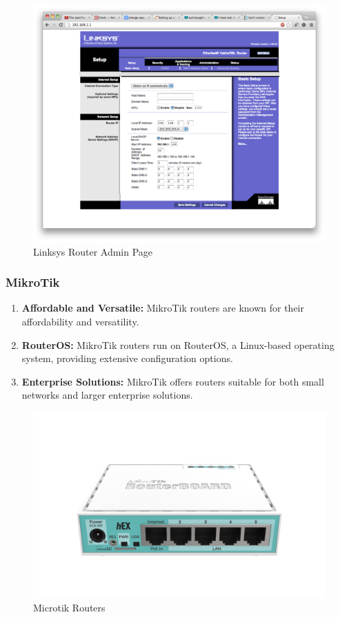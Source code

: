 \documentclass[11pt]{article}
\begin{document}
\begin{figure}[H]
  \centering
  \includegraphics[width=.95\textwidth]{linksys routers admin page/linksys routers admin page_7.jpg}
  \caption{Linksys Router Admin Page}
\end{figure}

\subsubsection{MikroTik}
\begin{enumerate}
  \item \textbf{Affordable and Versatile:} MikroTik routers are known for their affordability and versatility.

  \item \textbf{RouterOS:} MikroTik routers run on RouterOS, a Linux-based operating system, providing extensive configuration options.

  \item \textbf{Enterprise Solutions:} MikroTik offers routers suitable for both small networks and larger enterprise solutions.
\end{enumerate}

\begin{figure}[H]
  \centering
  \includegraphics[width=.45\textwidth]{microtik routers/microtik routers_4.jpg}
  \caption{Microtik Routers}
\end{figure}
\end{document}
